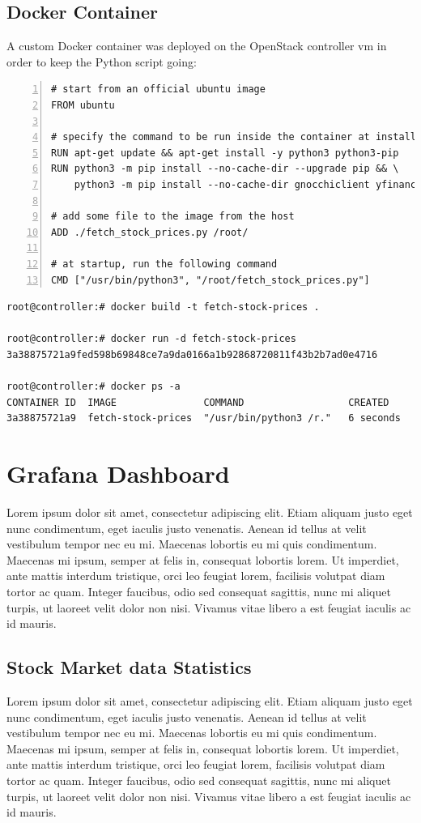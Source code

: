 \documentclass[11pt,a4paper]{article}
\begin{document}
\subsection{Docker Container}
A custom Docker container was deployed on the OpenStack controller vm in order to keep the Python script going:
\begin{lstlisting}[numbers=left, caption={Dockerfile}]
# start from an official ubuntu image
FROM ubuntu

# specify the command to be run inside the container at installation
RUN apt-get update && apt-get install -y python3 python3-pip
RUN python3 -m pip install --no-cache-dir --upgrade pip && \
    python3 -m pip install --no-cache-dir gnocchiclient yfinance pandas

# add some file to the image from the host
ADD ./fetch_stock_prices.py /root/

# at startup, run the following command
CMD ["/usr/bin/python3", "/root/fetch_stock_prices.py"]
\end{lstlisting}
\begin{lstlisting}[]
root@controller:# docker build -t fetch-stock-prices .

root@controller:# docker run -d fetch-stock-prices
3a38875721a9fed598b69848ce7a9da0166a1b92868720811f43b2b7ad0e4716

root@controller:# docker ps -a
CONTAINER ID  IMAGE               COMMAND                  CREATED
3a38875721a9  fetch-stock-prices  "/usr/bin/python3 /r."   6 seconds
\end{lstlisting}
\section{Grafana Dashboard}
Lorem ipsum dolor sit amet, consectetur adipiscing elit. Etiam aliquam justo eget nunc condimentum, eget iaculis justo venenatis. Aenean id tellus at velit vestibulum tempor nec eu mi. Maecenas lobortis eu mi quis condimentum. Maecenas mi ipsum, semper at felis in, consequat lobortis lorem. Ut imperdiet, ante mattis interdum tristique, orci leo feugiat lorem, facilisis volutpat diam tortor ac quam. Integer faucibus, odio sed consequat sagittis, nunc mi aliquet turpis, ut laoreet velit dolor non nisi. Vivamus vitae libero a est feugiat iaculis ac id mauris.
\subsection{Stock Market data Statistics}
Lorem ipsum dolor sit amet, consectetur adipiscing elit. Etiam aliquam justo eget nunc condimentum, eget iaculis justo venenatis. Aenean id tellus at velit vestibulum tempor nec eu mi. Maecenas lobortis eu mi quis condimentum. Maecenas mi ipsum, semper at felis in, consequat lobortis lorem. Ut imperdiet, ante mattis interdum tristique, orci leo feugiat lorem, facilisis volutpat diam tortor ac quam. Integer faucibus, odio sed consequat sagittis, nunc mi aliquet turpis, ut laoreet velit dolor non nisi. Vivamus vitae libero a est feugiat iaculis ac id mauris.
\end{document}
